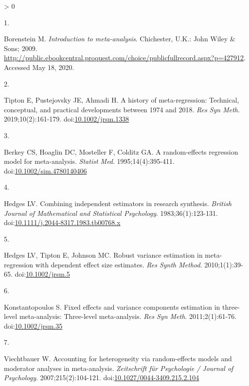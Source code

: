 \documentclass[
]{article}
\newlength{\cslhangindent}
\newlength{\csllabelwidth}
\newenvironment{CSLReferences}[2] %
 {%
  \setlength{\parindent}{0pt}
  \ifodd #1 \everypar{\setlength{\hangindent}{\cslhangindent}}\ignorespaces\fi
  \ifnum #2 > 0
  \setlength{\parskip}{#2\baselineskip}
  \fi
 }%
 {}
\newcommand{\CSLLeftMargin}[1]{\parbox[t]{\csllabelwidth}{#1}}
\newcommand{\CSLRightInline}[1]{\parbox[t]{\linewidth - \csllabelwidth}{#1}\break}
\begin{document}
\noindent

\hypertarget{refs}{}
\begin{CSLReferences}{0}{0}
\leavevmode\hypertarget{ref-borensteinIntroductionMetaanalysis2009}{}%
\CSLLeftMargin{1. }
\CSLRightInline{Borenstein M. \emph{Introduction to meta-analysis}. Chichester, U.K.: John Wiley \& Sons; 2009. \url{http://public.ebookcentral.proquest.com/choice/publicfullrecord.aspx?p=427912}. Accessed May 18, 2020.}

\leavevmode\hypertarget{ref-tiptonHistoryMetaregressionTechnical2019}{}%
\CSLLeftMargin{2. }
\CSLRightInline{Tipton E, Pustejovsky JE, Ahmadi H. A history of meta-regression: Technical, conceptual, and practical developments between 1974 and 2018. \emph{Res Syn Meth}. 2019;10(2):161-179. doi:\href{https://doi.org/10.1002/jrsm.1338}{10.1002/jrsm.1338}}

\leavevmode\hypertarget{ref-berkeyRandomeffectsRegressionModel1995}{}%
\CSLLeftMargin{3. }
\CSLRightInline{Berkey CS, Hoaglin DC, Mosteller F, Colditz GA. A random-effects regression model for meta-analysis. \emph{Statist Med}. 1995;14(4):395-411. doi:\href{https://doi.org/10.1002/sim.4780140406}{10.1002/sim.4780140406}}

\leavevmode\hypertarget{ref-hedgesCombiningIndependentEstimators1983}{}%
\CSLLeftMargin{4. }
\CSLRightInline{Hedges LV. Combining independent estimators in research synthesis. \emph{British Journal of Mathematical and Statistical Psychology}. 1983;36(1):123-131. doi:\href{https://doi.org/10.1111/j.2044-8317.1983.tb00768.x}{10.1111/j.2044-8317.1983.tb00768.x}}

\leavevmode\hypertarget{ref-hedgesRobustVarianceEstimation2010}{}%
\CSLLeftMargin{5. }
\CSLRightInline{Hedges LV, Tipton E, Johnson MC. Robust variance estimation in meta-regression with dependent effect size estimates. \emph{Res Synth Method}. 2010;1(1):39-65. doi:\href{https://doi.org/10.1002/jrsm.5}{10.1002/jrsm.5}}

\leavevmode\hypertarget{ref-konstantopoulosFixedEffectsVariance2011}{}%
\CSLLeftMargin{6. }
\CSLRightInline{Konstantopoulos S. Fixed effects and variance components estimation in three-level meta-analysis: Three-level meta-analysis. \emph{Res Syn Meth}. 2011;2(1):61-76. doi:\href{https://doi.org/10.1002/jrsm.35}{10.1002/jrsm.35}}

\leavevmode\hypertarget{ref-viechtbauerAccountingHeterogeneityRandomeffects2007}{}%
\CSLLeftMargin{7. }
\CSLRightInline{Viechtbauer W. Accounting for heterogeneity via random-effects models and moderator analyses in meta-analysis. \emph{Zeitschrift für Psychologie / Journal of Psychology}. 2007;215(2):104-121. doi:\href{https://doi.org/10.1027/0044-3409.215.2.104}{10.1027/0044-3409.215.2.104}}


\end{CSLReferences}
\end{document}
